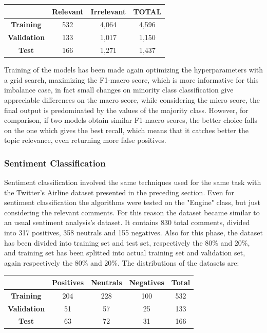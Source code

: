 \begin{center}
	\begin{tabular}{ | c | c  c | c | } 
		\hline
		& \textbf{Relevant} & \textbf{Irrelevant} & \textbf{TOTAL} \\
		\hline
		\textbf{Training} & 532 & 4,064 & 4,596 \\ 
		\hline
		\textbf{Validation} & 133 & 1,017 & 1,150 \\ 
		\hline
		\textbf{Test} & 166 & 1,271 & 1,437\\
		\hline
	\end{tabular}
\end{center}

Training of the models has been made again optimizing the hyperparameters with a grid search, maximizing the F1-macro score, which is more informative for this imbalance case, in fact small changes on minority class classification give appreciable differences on the macro score, while considering the micro score, the final output is predominated by the values of the majority class. However, for comparison, if two models obtain similar F1-macro scores, the better choice falls on the one which gives the best recall, which means that it catches better the topic relevance, even returning more false positives.



\subsubsection{Sentiment Classification}

Sentiment classification involved the same techniques used for the same task with the Twitter's Airline dataset presented in the preceding section. Even for sentiment classification the algorithms were tested on the "Engine" class, but just considering the relevant comments. For this reason the dataset became similar to an usual sentiment analysis's dataset. It contains 830 total comments, divided into 317 positives, 358 neutrals and 155 negatives. Also for this phase, the dataset has been divided into training set and test set, respectively the 80\% and 20\%, and training set has been splitted into actual training set and validation set, again respectively the 80\% and 20\%. The distributions of the datasets are:

\begin{center}
	\begin{tabular}{ | c | c  c c | c | } 
		\hline
		& \textbf{Positives} & \textbf{Neutrals} & \textbf{Negatives} & \textbf{Total} \\
		\hline
		\textbf{Training} & 204 & 228 & 100 & 532 \\ 
		\hline
		\textbf{Validation} & 51 & 57 & 25 & 133 \\ 
		\hline
		\textbf{Test} & 63 & 72 & 31 & 166 \\
		\hline
	\end{tabular}
\end{center}

